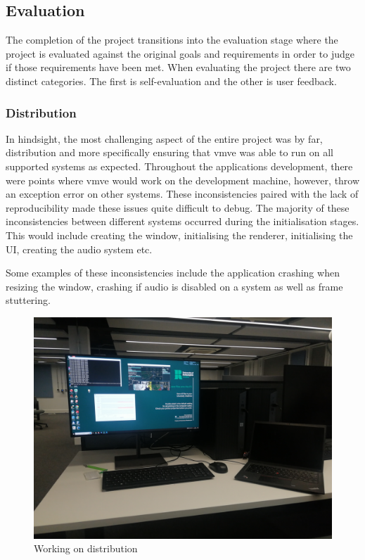 \documentclass[11pt]{article}
\begin{document}
\subsection{Evaluation} \label{evaluation}
The completion of the project transitions into the evaluation stage where the
project is evaluated against the original goals and requirements in order to
judge if those requirements have been met. When evaluating the project there are
two distinct categories. The first is self-evaluation and the other is user
feedback.


\subsubsection{Distribution}
In hindsight, the most challenging aspect of the entire project was by far,
distribution and more specifically ensuring that \gls*{vmve} was able to run on
all supported systems as expected. Throughout the applications development,
there were points where \gls*{vmve} would work on the development machine,
however, throw an exception error on other systems. These inconsistencies paired
with the lack of reproducibility made these issues quite difficult to debug. The
majority of these inconsistencies between different systems occurred during the
initialisation stages. This would include creating the window, initialising the
renderer, initialising the UI, creating the audio system etc.

Some examples of these inconsistencies include the application crashing when
resizing the window, crashing if audio is disabled on a system as well as frame
stuttering.

\begin{figure}[H]
  \centering
  \includegraphics[width=\textwidth]{images/multiple_systems.png}
  \caption{Working on distribution}
  \label{fig:multiple_systems}
\end{figure}
\end{document}
